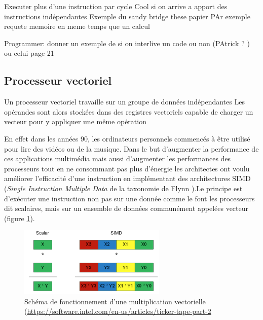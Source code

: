 Executer plus d'une instruction par cycle
Cool si on arrive a apport des instructions indépendantes
Exemple du sandy bridge these papier
PAr exemple requete memoire en meme temps que un calcul

Programmer: donner un exemple de si on interlive un code ou non (PAtrick ? ) ou celui page 21














\subsection{Processeur vectoriel}
\begin{fancyquotes}
Un processeur vectoriel travaille sur un groupe de données indépendantes Les opérandes sont alors stockées dans des registres vectoriels capable de charger un vecteur pour y appliquer une même opération \cite{hughes2015single}
\end{fancyquotes}

 En effet dans les années 90, les ordinateurs personnels commencés à être utilisé pour lire des vidéos ou de la musique. Dans le but d'augmenter la performance de ces applications multimédia mais aussi d'augmenter les performances des processeurs tout en ne consommant pas plus d'énergie les architectes ont voulu améliorer l'efficacité d'une instruction en implémentant des architectures SIMD (\textit{Single Instruction Multiple Data} de la taxonomie de Flynn \label{sub_taxonomie}).Le principe est d'exécuter une instruction non pas sur une donnée comme le font les processeurs dit scalaires, mais sur un ensemble de données communément appelées vecteur (figure \ref{pic_simd}).
 
 

\begin{figure}
    \center
    \includegraphics[width=7cm]{images/Chapitre1/simd.png}
    \caption{\label{pic_simd} Schéma de fonctionnement d'une multiplication vectorielle (\url{https://software.intel.com/en-us/articles/ticker-tape-part-2}}
\end{figure}

